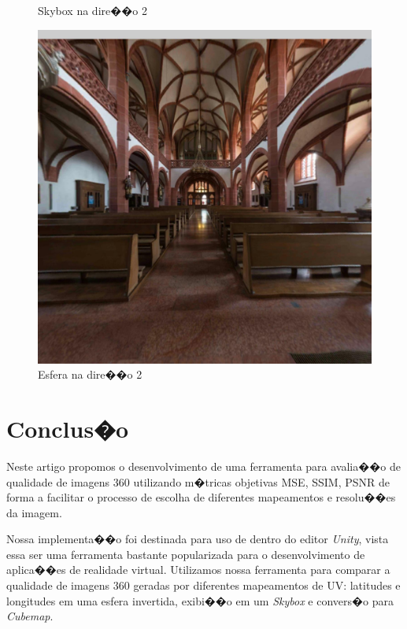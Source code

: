 \documentclass[12pt]{article}
\begin{document}
\begin{figure}[!tbp]
\begin{minipage}[b]{0.3\textwidth}
    \caption{Skybox na dire��o 2}
    \label{fig:skybox_direction_2}
  \end{minipage}
  \hfill
  \begin{minipage}[b]{0.3\textwidth}
    \centering
    \includegraphics[width=1.1\textwidth]{../images/screenshots/Screenshot_5_Sphere.jpg}
    \caption{Esfera na dire��o 2}
    \label{fig:sphere_direction_2}
  \end{minipage}
\end{figure}

\section{Conclus�o}  \label{sec:conclusion}

Neste artigo propomos o desenvolvimento de uma ferramenta para avalia��o de qualidade de imagens 360 utilizando m�tricas objetivas MSE, SSIM, PSNR de forma a facilitar o processo de escolha de diferentes mapeamentos e resolu��es da imagem.

Nossa implementa��o foi destinada para uso de dentro do editor \textit{Unity}, vista essa ser uma ferramenta bastante popularizada para o desenvolvimento de aplica��es de realidade virtual. Utilizamos nossa ferramenta para comparar a qualidade de imagens 360 geradas por diferentes mapeamentos de UV: latitudes e longitudes em uma esfera invertida, exibi��o em um \textit{Skybox} e convers�o para \textit{Cubemap}.
\end{document}
